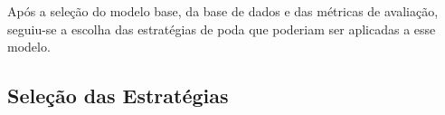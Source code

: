 Após a seleção do modelo base, da base de dados e das métricas de avaliação,
seguiu-se a escolha das estratégias de poda que poderiam ser
aplicadas a esse modelo.

\subsection{Seleção das Estratégias}\label{subsec:selecao_estrategias}

